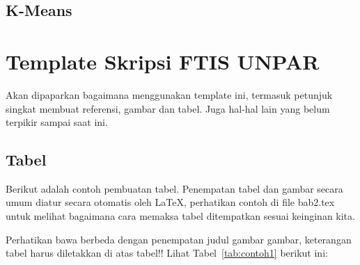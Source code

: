 
\subsection{K-Means}


\section{Template Skripsi FTIS UNPAR}
\label{sec:template}
 
Akan dipaparkan bagaimana menggunakan template ini, termasuk petunjuk singkat membuat referensi, gambar dan tabel.
Juga hal-hal lain yang belum terpikir sampai saat ini. 
 

\subsection{Tabel}  
Berikut adalah contoh pembuatan tabel. 
Penempatan tabel dan gambar secara umum diatur secara otomatis oleh \LaTeX{}, perhatikan contoh di file bab2.tex untuk melihat bagaimana cara memaksa tabel ditempatkan sesuai keinginan kita.

Perhatikan bawa berbeda dengan penempatan judul gambar gambar, keterangan tabel harus diletakkan di atas tabel!!
Lihat Tabel~\ref{tab:contoh1} berikut ini:

